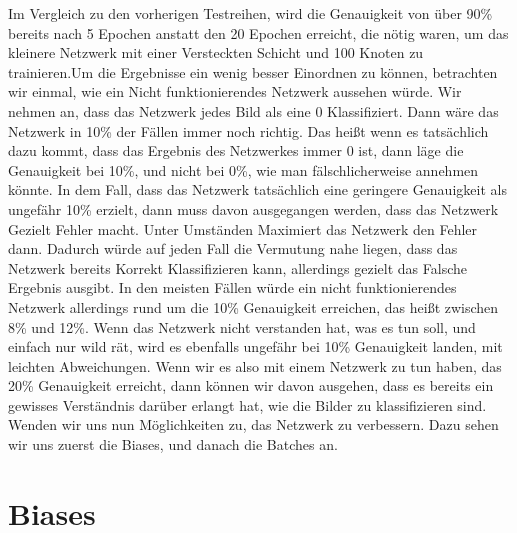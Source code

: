 \documentclass[12pt]{article}
\begin{document}
Im Vergleich zu den vorherigen Testreihen, wird die Genauigkeit von über 90\% bereits nach 5 Epochen anstatt den 20 Epochen erreicht, die nötig waren, um das kleinere Netzwerk mit einer Versteckten Schicht und 100 Knoten zu trainieren.Um die Ergebnisse ein wenig besser Einordnen zu können, betrachten wir einmal, wie ein Nicht funktionierendes Netzwerk aussehen würde. Wir nehmen an, dass das Netzwerk jedes Bild als eine 0 Klassifiziert. Dann wäre das Netzwerk in 10\% der Fällen immer noch richtig. Das heißt wenn es tatsächlich dazu kommt, dass das Ergebnis des Netzwerkes immer 0 ist, dann läge die Genauigkeit bei 10\%, und nicht bei 0\%, wie man fälschlicherweise annehmen könnte. In dem Fall, dass das Netzwerk tatsächlich eine geringere Genauigkeit als ungefähr 10\% erzielt, dann muss davon ausgegangen werden, dass das Netzwerk Gezielt Fehler macht. Unter Umständen Maximiert das Netzwerk den Fehler dann. Dadurch würde auf jeden Fall die Vermutung nahe liegen, dass das Netzwerk bereits Korrekt Klassifizieren kann, allerdings gezielt das Falsche Ergebnis ausgibt. In den meisten Fällen würde ein nicht funktionierendes Netzwerk allerdings rund um die 10\% Genauigkeit erreichen, das heißt zwischen 8\% und 12\%. Wenn das Netzwerk nicht verstanden hat, was es tun soll, und einfach nur wild rät, wird es ebenfalls ungefähr bei 10\% Genauigkeit landen, mit leichten Abweichungen. Wenn wir es also mit einem Netzwerk zu tun haben, das 20\% Genauigkeit erreicht, dann können wir davon ausgehen, dass es bereits ein gewisses Verständnis darüber erlangt hat, wie die Bilder zu klassifizieren sind. Wenden wir uns nun Möglichkeiten zu, das Netzwerk zu verbessern. Dazu sehen wir uns zuerst die Biases, und danach die Batches an.\section{Biases}
\end{document}
